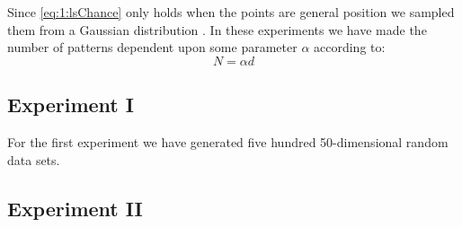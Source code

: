 Since \autoref{eq:1:lsChance} only holds when the points are general position we sampled them from a Gaussian distribution \cite[Chapter~5]{prince2012computer}. In these experiments we have made the number of patterns dependent upon some parameter $\alpha$ according to: 
	\begin{equation}
		N = \alpha d
	\end{equation}

\subsection*{Experiment I}
For the first experiment we have generated five hundred 50-dimensional random data sets. 

\subsection*{Experiment II}


